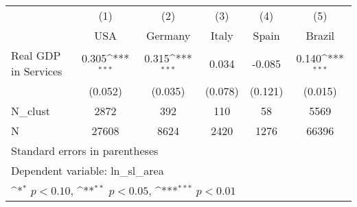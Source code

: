 {
\def\sym#1{\ifmmode^{#1}\else\(^{#1}\)\fi}
\begin{tabular}{l*{5}{c}}
\hline\hline
            &\multicolumn{1}{c}{(1)}&\multicolumn{1}{c}{(2)}&\multicolumn{1}{c}{(3)}&\multicolumn{1}{c}{(4)}&\multicolumn{1}{c}{(5)}\\
            &\multicolumn{1}{c}{USA}&\multicolumn{1}{c}{Germany}&\multicolumn{1}{c}{Italy}&\multicolumn{1}{c}{Spain}&\multicolumn{1}{c}{Brazil}\\
\hline
Real GDP in Services&       0.305\sym{***}&       0.315\sym{***}&       0.034         &      -0.085         &       0.140\sym{***}\\
            &     (0.052)         &     (0.035)         &     (0.078)         &     (0.121)         &     (0.015)         \\
\hline
N\_clust     &        2872         &         392         &         110         &          58         &        5569         \\
N           &       27608         &        8624         &        2420         &        1276         &       66396         \\
\hline\hline
\multicolumn{6}{l}{\footnotesize Standard errors in parentheses}\\
\multicolumn{6}{l}{\footnotesize Dependent variable: ln\_sl\_area}\\
\multicolumn{6}{l}{\footnotesize \sym{*} \(p<0.10\), \sym{**} \(p<0.05\), \sym{***} \(p<0.01\)}\\
\end{tabular}
}
